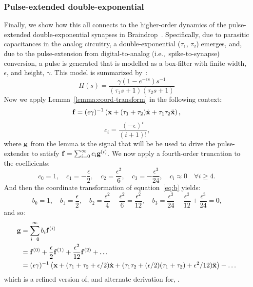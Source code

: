 \subsubsection{Pulse-extended double-exponential}

Finally, we show how this all connects to the higher-order dynamics of the pulse-extended double-exponential synapses in Braindrop~\citep{voelker2017iscas}.
Specifically, due to parasitic capacitances in the analog circuitry, a double-exponential ($\tau_1$, $\tau_2$) emerges, and, due to the pulse-extension from digital-to-analog (i.e.,~spike-to-synapse) conversion, a pulse is generated that is modelled as a box-filter with finite width, $\epsilon$, and height, $\gamma$.
This model is summarized by~\citet[][equation~8]{voelker2017iscas}:
\begin{equation} \label{eq:braindrop-synapse}
H(s) = \frac{ \gamma \left(1 - e^{-\epsilon s} \right) s^{-1}}{ \left( \tau_1 s + 1 \right) \left( \tau_2 s + 1 \right) }
\end{equation}
Now we apply Lemma~\ref{lemma:coord-transform} in the following context:
$$
\mathbf{f} = (\epsilon \gamma)^{-1} \left( \mathbf{x} + (\tau_1 + \tau_2) \dot{\mathbf{x}} + \tau_1 \tau_2 \ddot{\mathbf{x}} \right) \text{,}
$$
$$
c_i = \frac{(-\epsilon)^i}{(i + 1)!} \text{,}
$$
where $\mathbf{g}$ from the lemma is the signal that will be be used to drive the pulse-extender to satisfy $\mathbf{f} = \sum_{i=0}^\infty c_i \mathbf{g}^{(i)}$.
We now apply a fourth-order truncation to the coefficients:
$$
c_0 = 1, \quad c_1 = -\frac{\epsilon}{2}, \quad c_2 = \frac{\epsilon^2}{6}, \quad c_3 = -\frac{\epsilon^3}{24}, \quad c_i \approx 0 \quad \forall i \ge 4 \text{.}
$$
And then the coordinate transformation of equation~\ref{eq:b} yields:
$$
b_0 = 1, \quad b_1 = \frac{\epsilon}{2}, \quad b_2 = \frac{\epsilon^2}{4} - \frac{\epsilon^2}{6} = \frac{\epsilon^2}{12}, \quad b_3 = \frac{\epsilon^3}{24} - \frac{\epsilon^3}{12} + \frac{\epsilon^3}{24} = 0 \text{,}
$$
and so:
\begin{align} \label{eq:pulse-extended-double-exp}
\mathbf{g} &= \sum_{i=0}^\infty b_i \mathbf{f}^{(i)} \nonumber \\
        &= \mathbf{f}^{(0)} + \frac{\epsilon}{2} \mathbf{f}^{(1)} + \frac{\epsilon^2}{12} \mathbf{f}^{(2)} + \ldots \nonumber \\
        &= (\epsilon \gamma)^{-1} \left( \mathbf{x} + (\tau_1 + \tau_2 + \epsilon / 2) \dot{\mathbf{x}} + (\tau_1 \tau_2 + (\epsilon / 2 ) (\tau_1 + \tau_2) + \epsilon^2 / 12) \ddot{\mathbf{x}} \right) + \ldots
\end{align}
which is a refined version of, and alternate derivation for, \citet[][equation~11]{voelker2017iscas}.

